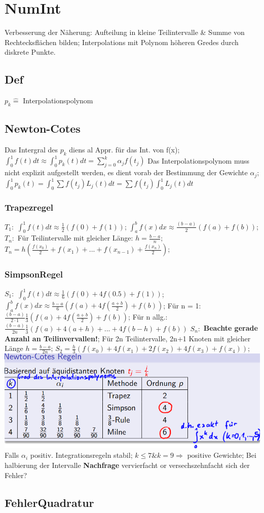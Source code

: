 \section{NumInt}
Verbesserung der Näherung: Aufteilung in kleine Teilintervalle \& Summe von Rechtecksflächen bilden; Interpolations mit Polynom höheren Gredes durch diskrete Punkte.
\subsection{Def}
$ p_{k} \hat{=} $ Interpolationspolynom

\subsection{Newton-Cotes}
Das Intergral des $ p_{k} $ diens al Appr. für das Int. von f(x); 
$ \int_{0}^{1} f(t) dt \approx \int_{0}^{1} p_{k} (t) dt =  \sum_{j=0}^{k} \alpha_j f( t_{j} ) $ Das Interpolationspolynom muss nicht explizit aufgestellt werden, es dient vorab der Bestimmung der Gewichte $ \alpha_{j} $; 
$ \int_{0}^{1} p_{k}(t) = \int_{0}^{1} \sum f( t_{j} ) L_{j} (t) dt = \sum f ( t_{j} ) \int_{0}^{1} L_{j} (t) dt $
\subsubsection{Trapezregel}
$ T_{1}: $ 
$ \int_{0}^{1} f (t) dt \approx \frac{1}{2} ( f(0) + f(1) ) $; 
$ \int_{a}^{b} f (x) dx \approx \frac{(b-a)}{2} (f(a) + f(b) ) $;\\
$ T_{n}: $
Für Teilintervalle mit gleicher Länge: $ h = \frac{b-a}{n} $;  
$ T_{n} = h (\frac{ f ( x_{0} ) }{2} + f(x_{1}) + ... + f(x_{n-1}) + \frac{ f(x_n) }{2} ) $; 
\subsubsection{SimpsonRegel}
$ S_{1}: $ 
$ \int_{0}^{1} f (t) dt \approx \frac{1}{6} ( f(0) + 4f(0.5) + f(1) ) $; 
$\int_{a}^{b} f (x) dx \approx \frac{b-a}{6} ( f(a) + 4f( \frac{a+b}{2}) + f(b) ) $; 
Für n = 1: $\frac{( b-a )}{2\cdot1} \frac{1}{3} ( f(a) + 4f( \frac{a+b}{2}) + f(b) ) $; 
Für n allg.: $ \frac{( b-a) }{2n}\frac{1}{3} ( f(a) + 4(a+h) + ... + 4f(b-h)+ f(b) ) $ 
$ S_{n}:$ 
\textbf{Beachte gerade Anzahl an Teilinvervallen!}; 
Für 2n Teilintervalle, 2n+1 Knoten mit gleicher Länge $ h = \frac{ b-a }{2n} $; 
$ S_{2} = \frac{h}{3} ( f(x_{0}) + 4f(x_{1}) + 2f(x_{2}) + 4f(x_{3}) + f(x_{4}) ) $; 
\includegraphics[scale=0.25]{./pic/NewtonCodesRegeln.png}
Falls $\alpha_{i} $ positiv. Integrationsregeln stabil; 
$ k \le 7 \& k =9 \Rightarrow $ positive Gewichte;
Bei halbierung der Intervalle \textbf{Nachfrage} vervierfacht or versechszehnfacht sich der Fehler?
\subsection{FehlerQuadratur}
